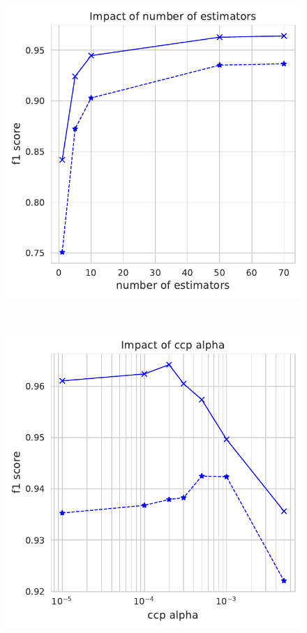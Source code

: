 \documentclass[11pt]{article}
\begin{document}
\begin{figure}
\begin{minipage}[l]{0.3\textwidth}
\end{minipage}
\begin{minipage}[l]{0.3\textwidth}
\includegraphics[width=1\linewidth]{email_spam/rnd_trees.pdf}
\end{minipage}\\
\begin{minipage}[l]{0.3\textwidth}
\includegraphics[width=1\linewidth]{email_spam/rnd_ccpalpha.pdf}

\end{minipage}
\end{figure}
\end{document}
